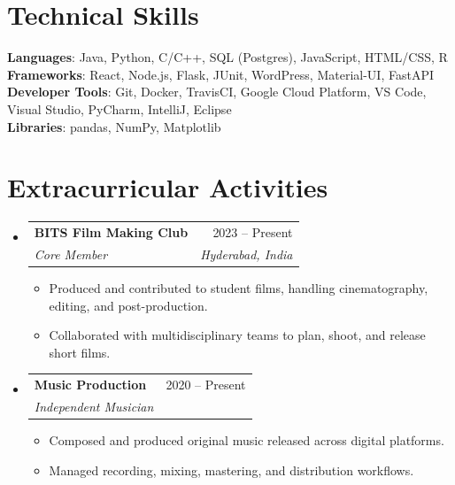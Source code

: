 \documentclass[letterpaper,11pt]{article}
\makeatletter
\newcommand{\resumeItem}[1]{
  \item\small{
    {#1 \vspace{-2pt}}
  }
}
\newcommand{\resumeSubheading}[4]{
  \vspace{-2pt}\item
    \begin{tabular*}{0.97\textwidth}[t]{l@{\extracolsep{\fill}}r}
      \textbf{#1} & #2 \\
      \textit{\small#3} & \textit{\small #4} \\
    \end{tabular*}\vspace{-7pt}
}
\newcommand{\resumeSubHeadingListStart}{\begin{itemize}[leftmargin=0.15in, label={}]}
\newcommand{\resumeSubHeadingListEnd}{\end{itemize}}
\newcommand{\resumeItemListStart}{\begin{itemize}}
\newcommand{\resumeItemListEnd}{\end{itemize}\vspace{-5pt}}
\makeatother
\begin{document}
%
\section{Technical Skills}
 \begin{itemize}[leftmargin=0.15in, label={}]
    \small{\item{
     \textbf{Languages}{: Java, Python, C/C++, SQL (Postgres), JavaScript, HTML/CSS, R} \\
     \textbf{Frameworks}{: React, Node.js, Flask, JUnit, WordPress, Material-UI, FastAPI} \\
     \textbf{Developer Tools}{: Git, Docker, TravisCI, Google Cloud Platform, VS Code, Visual Studio, PyCharm, IntelliJ, Eclipse} \\
     \textbf{Libraries}{: pandas, NumPy, Matplotlib}
    }}
 \end{itemize}

\section{Extracurricular Activities}

\resumeSubHeadingListStart

\resumeSubheading
{BITS Film Making Club}{2023 -- Present}
{Core Member}{Hyderabad, India}
\resumeItemListStart
\resumeItem{Produced and contributed to student films, handling cinematography, editing, and post-production.}
\resumeItem{Collaborated with multidisciplinary teams to plan, shoot, and release short films.}
\resumeItemListEnd

\resumeSubheading
{Music Production}{2020 -- Present}
{Independent Musician}{}
\resumeItemListStart
\resumeItem{Composed and produced original music released across digital platforms.}
\resumeItem{Managed recording, mixing, mastering, and distribution workflows.}
\resumeItemListEnd

\resumeSubHeadingListEnd

\end{document}
